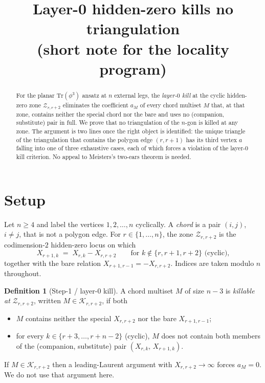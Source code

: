 \documentclass[11pt]{article}
\title{Layer-0 hidden-zero kills no triangulation\\
       \small{(short note for the locality program)}}
\date{}
\theoremstyle{definition}
\newtheorem{defn}[thm]{Definition}
\begin{document}
\maketitle

\begin{abstract}
For the planar $\mathrm{Tr}(\phi^3)$ ansatz at $n$ external legs, the
\emph{layer-$0$ kill} at the cyclic hidden-zero zone $\mathcal Z_{r,r+2}$
eliminates the coefficient $a_M$ of every chord multiset $M$ that, at
that zone, contains neither the special chord nor the bare and uses no
(companion, substitute) pair in full. We prove that no triangulation of
the $n$-gon is killed at any zone. The argument is two lines once the
right object is identified: the unique triangle of the triangulation
that contains the polygon edge $(r,r{+}1)$ has its third vertex $a$
falling into one of three exhaustive cases, each of which forces a
violation of the layer-$0$ kill criterion. No appeal to Meisters's
two-ears theorem is needed.
\end{abstract}

\section{Setup}

Let $n\ge 4$ and label the vertices $1,2,\dots,n$ cyclically. A
\emph{chord} is a pair $(i,j)$, $i\ne j$, that is not a polygon edge.
For $r\in\{1,\dots,n\}$, the zone $\mathcal Z_{r,r+2}$ is the
codimension-$2$ hidden-zero locus on which
\begin{equation}\label{eq:subs}
   X_{r+1,k} \;=\; X_{r,k} - X_{r,r+2}
   \qquad
   \text{for } k\notin\{r,r{+}1,r{+}2\}\text{ (cyclic),}
\end{equation}
together with the bare relation $X_{r+1,r-1} = -X_{r,r+2}$. Indices are
taken modulo $n$ throughout.

\begin{defn}[Step-1 / layer-$0$ kill]\label{defn:K}
A chord multiset $M$ of size $n{-}3$ is \emph{killable at
$\mathcal Z_{r,r+2}$}, written $M\in\mathcal K_{r,r+2}$, if both
\begin{itemize}[leftmargin=*,topsep=0pt,parsep=0pt,itemsep=2pt]
\item[\rm (K1)] $M$ contains neither the special $X_{r,r+2}$ nor the
       bare $X_{r+1,r-1}$;
\item[\rm (K2)] for every $k\in\{r{+}3,\dots,r{+}n{-}2\}$ (cyclic), $M$
       does not contain both members of the (companion, substitute) pair
       $(X_{r,k},\,X_{r+1,k})$.
\end{itemize}
If $M\in\mathcal K_{r,r+2}$ then a leading-Laurent argument with
$X_{r,r+2}\to\infty$ forces $a_M=0$. We do not use that argument here.
\end{defn}
\end{document}

